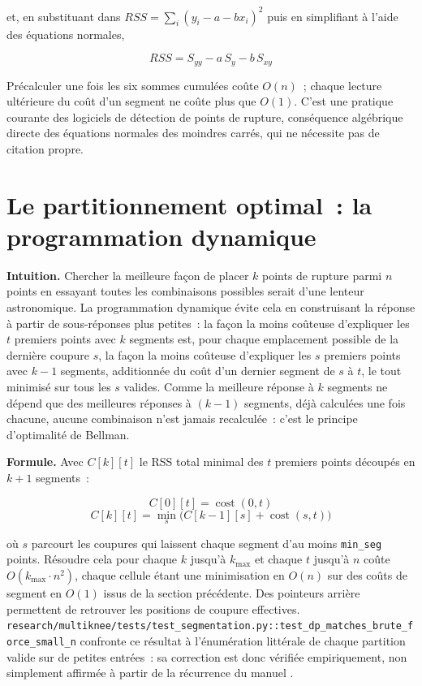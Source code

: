 \documentclass[11pt]{article}
\newcommand{\code}[1]{\texttt{#1}}
\begin{document}
et, en substituant dans $RSS = \sum_i (y_i - a - b x_i)^2$ puis en
simplifiant à l'aide des équations normales,

\begin{equation}
RSS = S_{yy} - a\,S_y - b\,S_{xy}
\end{equation}

Précalculer une fois les six sommes cumulées coûte $O(n)$~; chaque lecture
ultérieure du coût d'un segment ne coûte plus que $O(1)$. C'est une
pratique courante des logiciels de détection de points de rupture,
conséquence algébrique directe des équations normales des moindres carrés,
qui ne nécessite pas de citation propre.

\section{Le partitionnement optimal~: la programmation dynamique}
\label{sec:dp}
\label{sec:pd}

\textbf{Intuition.} Chercher la meilleure façon de placer $k$ points de
rupture parmi $n$ points en essayant toutes les combinaisons possibles
serait d'une lenteur astronomique. La programmation dynamique évite cela en
construisant la réponse à partir de sous-réponses plus petites~: la façon
la moins coûteuse d'expliquer les $t$ premiers points avec $k$ segments
est, pour chaque emplacement possible de la dernière coupure $s$, la façon
la moins coûteuse d'expliquer les $s$ premiers points avec $k-1$ segments,
additionnée du coût d'un dernier segment de $s$ à $t$, le tout minimisé sur
tous les $s$ valides. Comme la meilleure réponse à $k$ segments ne dépend
que des meilleures réponses à $(k-1)$ segments, déjà calculées une fois
chacune, aucune combinaison n'est jamais recalculée~: c'est le principe
d'optimalité de Bellman.

\textbf{Formule.} Avec $C[k][t]$ le RSS total minimal des $t$ premiers
points découpés en $k+1$ segments~:

\begin{equation}
C[0][t] = \operatorname{cost}(0, t)
\end{equation}
\begin{equation}
C[k][t] = \min_{s} \Big( C[k-1][s] + \operatorname{cost}(s, t) \Big)
\end{equation}

où $s$ parcourt les coupures qui laissent chaque segment d'au moins
\code{min\_seg} points. Résoudre cela pour chaque $k$ jusqu'à $k_{\max}$ et
chaque $t$ jusqu'à $n$ coûte $O(k_{\max} \cdot n^2)$, chaque cellule étant
une minimisation en $O(n)$ sur des coûts de segment en $O(1)$ issus de la
section précédente. Des pointeurs arrière permettent de retrouver les
positions de coupure effectives.
\code{research/multiknee/tests/test\_segmentation.py::test\_dp\_matches\_brute\_force\_small\_n}
confronte ce résultat à l'énumération littérale de chaque partition valide
sur de petites entrées~: sa correction est donc vérifiée empiriquement, non
simplement affirmée à partir de la récurrence du manuel
\citep{cormen2022algorithms,dasgupta2006algorithms}.
\end{document}
